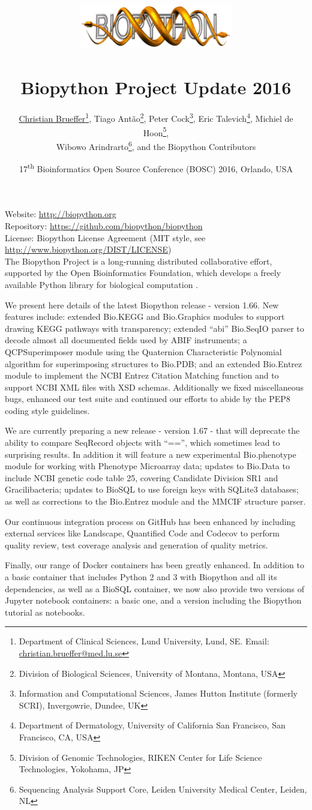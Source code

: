 \documentclass[10pt,oneside]{article}
\title{%
\vspace{-1.5in}
\includegraphics[width=0.5\textwidth]{biopython.jpg}\\
~\\Biopython Project Update 2016}
\author{
	\underline{Christian Brueffer}\thanks{Department of Clinical Sciences, Lund University, Lund, SE. Email: \href{mailto:christian.brueffer@med.lu.se}{christian.brueffer@med.lu.se}},
    Tiago Ant\~{a}o\thanks{Division of Biological Sciences, University of Montana, Montana, USA},
    Peter Cock\thanks{Information and Computational Sciences, James Hutton Institute (formerly SCRI), Invergowrie, Dundee, UK},
    Eric Talevich\thanks{Department of Dermatology, University of California San Francisco, San Francisco, CA, USA},
    Michiel de Hoon\thanks{Division of Genomic Technologies, RIKEN Center for Life Science Technologies, Yokohama, JP},
	\\
    Wibowo Arindrarto\thanks{Sequencing Analysis Support Core, Leiden University Medical Center, Leiden, NL},
    and the Biopython Contributors}
\date{17\textsuperscript{th} Bioinformatics Open Source Conference (BOSC) 2016, Orlando, USA}
\begin{document}
\maketitle
\thispagestyle{empty}

\vspace{-0.2in}
\noindent
Website: \url{http://biopython.org} \\
Repository: \url{https://github.com/biopython/biopython} \\
License: Biopython License Agreement (MIT style, see \url{http://www.biopython.org/DIST/LICENSE}) \\

The Biopython Project is a long-running distributed collaborative effort,
supported by the Open Bioinformatics Foundation, which develops a freely
available Python library for biological computation \cite{AppNote}.

We present here details of the latest Biopython release - version 1.66. New
features include: extended Bio.KEGG and Bio.Graphics modules to support drawing
KEGG pathways with transparency; extended ``abi'' Bio.SeqIO parser to decode
almost all documented fields used by ABIF instruments; a QCPSuperimposer
module using the Quaternion Characteristic Polynomial algorithm for superimposing
structures to Bio.PDB; and an extended Bio.Entrez module to implement the NCBI
Entrez Citation Matching function and to support NCBI XML files with XSD schemas.
Additionally we fixed miscellaneous bugs, enhanced our test suite and continued our
efforts to abide by the PEP8 coding style guidelines.

We are currently preparing a new release - version 1.67 - that will deprecate the
ability to compare SeqRecord objects with ``=='', which sometimes lead to surprising
results.  In addition it will feature a new experimental Bio.phenotype module for
working with Phenotype Microarray data; updates to Bio.Data to include NCBI genetic
code table 25, covering Candidate Division SR1 and Gracilibacteria; updates
to BioSQL to use foreign keys with SQLite3 databases; as well as corrections
to the Bio.Entrez module and the MMCIF structure parser.

Our continuous integration process on GitHub has been enhanced by including
external services like Landscape, Quantified Code and Codecov to perform
quality review, test coverage analysis and generation of quality metrics.

Finally, our range of Docker containers has been greatly enhanced. In addition to
a basic container that includes Python 2 and 3 with Biopython and all its
dependencies, as well as a BioSQL container, we now also provide two versions
of Jupyter notebook containers: a basic one, and a version including the
Biopython tutorial as notebooks.
\end{document}
